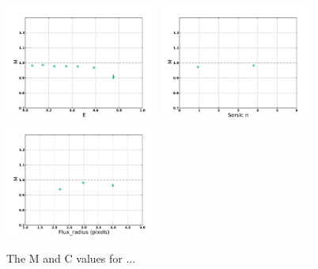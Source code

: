 \begin{figure}
\centering
\includegraphics[width=0.45\textwidth]{fig/MvaleI3.pdf} 
\includegraphics[width=0.45\textwidth]{fig/Mval_typeI3.pdf} 
\includegraphics[width=0.45\textwidth]{fig/Mval_sizeI3.pdf} 
\caption{The M and C values for ...}
\label{fig:DEIMOS_m}
\end{figure}

\newpage 
